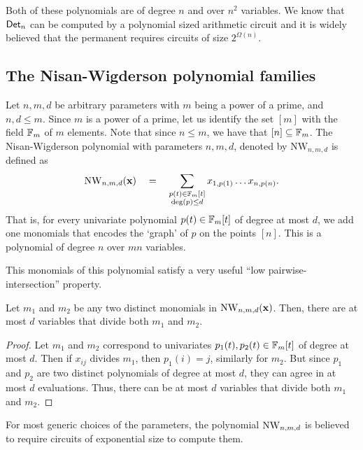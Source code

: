 Both of these polynomials are of degree $n$ and over $n^2$ variables. 
We know that $\operatorname{\mathsf{Det}}_n$ can be computed by a polynomial sized arithmetic circuit and it is widely believed that the permanent requires circuits of size $2^{\Omega(n)}$. 

\subsection*{The Nisan-Wigderson polynomial families}

\begin{definition}\label{defn:NW-polyfamilies}
Let $n,m,d$ be arbitrary parameters with $m$ being a power of a prime, and $n,d\leq m$. 
Since $m$ is a power of a prime, let us identify the set $[m]$ with the field $\mathbb{F}_m$ of $m$ elements. 
Note that since $n \leq m$, we have that $[n] \subseteq \mathbb{F}_m$. 
The Nisan-Wigderson polynomial with parameters $n,m,d$, denoted by $\mathrm{NW}_{n,m,d}$ is defined as
\[
\operatorname{\mathrm{NW}}_{n,m,d}(\mathbf{x}) \quad = \quad \sum_{\substack{p(t) \in \mathbb{F}_m[t]\\ \deg(p) \leq d}} x_{1,p(1)}\dots x_{n,p(n)}.
\]
That is, for every univariate polynomial $p(t) \in \mathbb{F}_m[t]$ of degree at most $d$, we add one monomials that encodes the `graph' of $p$ on the points $[n]$. 
This is a polynomial of degree $n$ over $mn$ variables.
\end{definition}


This monomials of this polynomial satisfy a very useful ``low pairwise-intersection'' property. 

\begin{lemma}\label{lem:NW-low-intersection}
Let $m_1$ and $m_2$ be any two distinct monomials in $\operatorname{\mathrm{NW}}_{n,m,d}(\mathbf{x})$. 
Then, there are at most $d$ variables that divide both $m_1$ and $m_2$. 
\end{lemma}
\begin{proof}
Let $m_1$ and $m_2$ correspond to univariates $p_1(t), p_2(t) \in \mathbb{F}_m[t]$ of degree at most $d$. 
Then if $x_{ij}$ divides $m_1$, then $p_1(i) = j$, similarly for $m_2$.
But since $p_1$ and $p_2$ are two distinct polynomials of degree at most $d$, they can agree in at most $d$ evaluations. 
Thus, there can be at most $d$ variables that divide both $m_1$ and $m_2$.
\end{proof}

For most generic choices of the parameters, the polynomial $\operatorname{\mathrm{NW}}_{n,m,d}$ is believed to require circuits of exponential size to compute them. 

